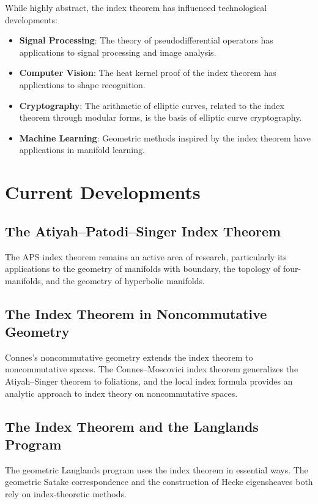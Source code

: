 While highly abstract, the index theorem has influenced technological developments:
\begin{itemize}
\item \textbf{Signal Processing}: The theory of pseudodifferential operators has applications to signal processing and image analysis.
\item \textbf{Computer Vision}: The heat kernel proof of the index theorem has applications to shape recognition.
\item \textbf{Cryptography}: The arithmetic of elliptic curves, related to the index theorem through modular forms, is the basis of elliptic curve cryptography.
\item \textbf{Machine Learning}: Geometric methods inspired by the index theorem have applications in manifold learning.
\end{itemize}

\section{Current Developments}

\subsection{The Atiyah--Patodi--Singer Index Theorem}

The APS index theorem remains an active area of research, particularly its applications to the geometry of manifolds with boundary, the topology of four-manifolds, and the geometry of hyperbolic manifolds.

\subsection{The Index Theorem in Noncommutative Geometry}

Connes's noncommutative geometry extends the index theorem to noncommutative spaces. The Connes--Moscovici index theorem generalizes the Atiyah--Singer theorem to foliations, and the local index formula provides an analytic approach to index theory on noncommutative spaces.

\subsection{The Index Theorem and the Langlands Program}

The geometric Langlands program uses the index theorem in essential ways. The geometric Satake correspondence and the construction of Hecke eigensheaves both rely on index-theoretic methods.

